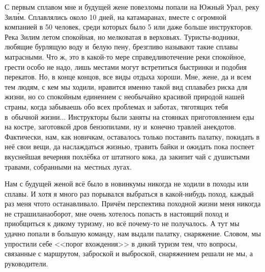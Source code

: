 С первым сплавом мне и будущей жене повезло\mdash мы попали на Южный Урал, реку Зил\'{и}м. Сплавлялись около 10 дней, на катамаранах, вместе с огромной компанией в 50 человек, среди которых было 5 или даже больше инструкторов. Река Зилим летом спокойная, но мелковатая в верховьях. Туристы-водники, любящие бурлящую воду и~белую пену, брезгливо называют такие сплавы матрасными. Что ж, это в какой-то мере справедливо\mdash течение реки спокойное, грести особо не надо, лишь местами могут встретиться быстринки и подобия перекатов. Но, в конце концов, все виды отдыха хороши. Мне, жене, да и всем тем людям, с кем мы ходили, нравится именно такой вид сплава\mdash без риска для жизни, но со спокойным единением с необычайно красивой природой нашей страны, когда забываешь обо всех проблемах и заботах, тяготящих тебя в~обычной жизни$\ldots$
\newpage
Инструкторы были заняты на стоянках приготовлением еды на костре, заготовкой дров бензопилами, ну и~конечно травлей анекдотов. Фактически, нам, как новичкам, оставалось только поставить палатку, покидать в неё свои вещи, да наслаждаться жизнью, травить байки и ожидать пока поспеет вкуснейшая вечерняя похлёбка от штатного кока, да закипит чай с душистыми травами, собранными на~местных лугах. 

Нам с будущей женой всё было в новинку\mdash мы никогда не ходили в походы или сплавы. И хотя я много раз порывался выбраться в какой-нибудь поход, каждый раз меня что\sdash то останавливало. Причём перспектива походной жизни меня никогда не страшила\mdash наоборот, мне очень хотелось попасть в настоящий поход и приобщиться к дикому туризму, но всё почему-то не получалось. А тут мы удачно попали в большую команду, нам выдали палатку, снаряжение. Словом, мы упростили себе <<порог вхождения>> в дикий туризм тем, что вопросы, связанные с маршрутом, заброской и выброской, снаряжением решали не мы, а руководители.

